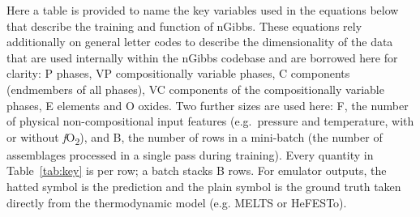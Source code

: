 Here a table is provided to name the key variables used in the equations below that describe the training and function of nGibbs. 
These equations rely additionally on general letter codes to describe the dimensionality of the data that are used internally within 
the nGibbs codebase and are borrowed here for clarity: P phases, VP compositionally variable phases, C components (endmembers of all phases),
VC components of the compositionally variable phases, E elements and O oxides. Two further sizes are
used here: F, the number of physical non-compositional input features (e.g.\ pressure and temperature, with or without \emph{f}O\textsubscript{2}),
and B, the number of rows in a mini-batch (the number of assemblages processed in a single pass during training). 
Every quantity in Table~\ref{tab:key} is per row; a batch stacks B rows. For emulator outputs, the hatted symbol is the prediction and
the plain symbol is the ground truth taken directly from the thermodynamic model (e.g. MELTS or HeFESTo).

